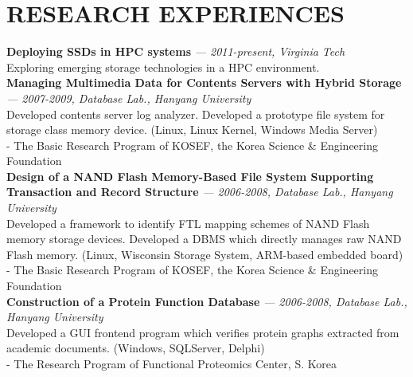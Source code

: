 \section{RESEARCH EXPERIENCES} 
\vspace{0.07in}
  {\bf Deploying SSDs in HPC systems}
    {\it \footnotesize --- 2011-present, Virginia Tech} \\
    Exploring emerging storage technologies in a HPC environment.
    \vspace{0.03in}\\
  {\bf Managing Multimedia Data for Contents Servers with Hybrid Storage}
    {\it \footnotesize --- 2007-2009, Database Lab., Hanyang University}\\
    Developed contents server log analyzer.
    Developed a prototype file system for storage class memory device.
    {\footnotesize(Linux, Linux Kernel, Windows Media Server)} \\
    - {\small The Basic Research Program of KOSEF, the Korea Science \& Engineering
      Foundation}
    \vspace{0.03in}\\
  {\bf Design of a NAND Flash Memory-Based File System Supporting Transaction and
       Record Structure} 
     {\it \footnotesize --- 2006-2008, Database Lab., Hanyang University}\\
     Developed a framework to identify FTL mapping schemes of NAND Flash memory
     storage devices.  Developed a DBMS which directly manages raw NAND Flash
     memory.
     {\footnotesize(Linux, Wisconsin Storage System, ARM-based embedded
      board)}\\
     - {\small The Basic Research Program of KOSEF, the Korea Science \& Engineering
        Foundation}
    \vspace{0.03in}\\
   {\bf Construction of a Protein Function Database} 
     {\it \footnotesize --- 2006-2008, Database Lab., Hanyang University}\\
     Developed a GUI frontend program which verifies protein graphs extracted
     from academic documents.
     {\footnotesize(Windows, SQLServer, Delphi)}\\
     - {\small The Research Program of Functional Proteomics Center, S.  Korea}

